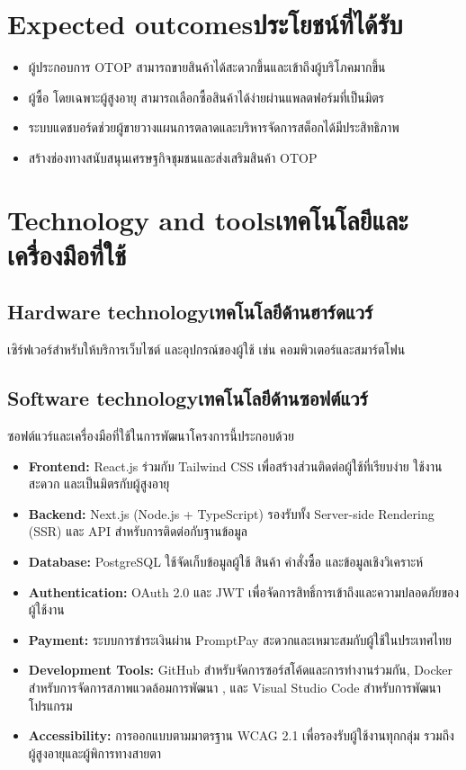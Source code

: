\section{\ifenglish Expected outcomes\else ประโยชน์ที่ได้รับ\fi}
\begin{itemize}
    \item ผู้ประกอบการ OTOP สามารถขายสินค้าได้สะดวกขึ้นและเข้าถึงผู้บริโภคมากขึ้น
    \item ผู้ซื้อ โดยเฉพาะผู้สูงอายุ สามารถเลือกซื้อสินค้าได้ง่ายผ่านแพลตฟอร์มที่เป็นมิตร
    \item ระบบแดชบอร์ดช่วยผู้ขายวางแผนการตลาดและบริหารจัดการสต็อกได้มีประสิทธิภาพ
    \item สร้างช่องทางสนับสนุนเศรษฐกิจชุมชนและส่งเสริมสินค้า OTOP
\end{itemize}

\section{\ifenglish Technology and tools\else เทคโนโลยีและเครื่องมือที่ใช้\fi}

\subsection{\ifenglish Hardware technology\else เทคโนโลยีด้านฮาร์ดแวร์\fi}
เซิร์ฟเวอร์สำหรับให้บริการเว็บไซต์ และอุปกรณ์ของผู้ใช้ เช่น คอมพิวเตอร์และสมาร์ตโฟน \cite{latexcompanion}

\subsection{\ifenglish Software technology\else เทคโนโลยีด้านซอฟต์แวร์\fi}
ซอฟต์แวร์และเครื่องมือที่ใช้ในการพัฒนาโครงการนี้ประกอบด้วย \cite{responsiveweb}

\begin{itemize}
    \item \textbf{Frontend:} React.js ร่วมกับ Tailwind CSS 
    เพื่อสร้างส่วนติดต่อผู้ใช้ที่เรียบง่าย ใช้งานสะดวก และเป็นมิตรกับผู้สูงอายุ \cite{responsiveweb}
    \item \textbf{Backend:} Next.js (Node.js + TypeScript) 
    รองรับทั้ง Server-side Rendering (SSR) และ API สำหรับการติดต่อกับฐานข้อมูล
    \item \textbf{Database:} PostgreSQL 
    ใช้จัดเก็บข้อมูลผู้ใช้ สินค้า คำสั่งซื้อ และข้อมูลเชิงวิเคราะห์
    \item \textbf{Authentication:} OAuth 2.0 และ JWT 
    เพื่อจัดการสิทธิ์การเข้าถึงและความปลอดภัยของผู้ใช้งาน
    \item \textbf{Payment:} ระบบการชำระเงินผ่าน PromptPay 
    สะดวกและเหมาะสมกับผู้ใช้ในประเทศไทย
    \item \textbf{Development Tools:} 
    GitHub สำหรับจัดการซอร์สโค้ดและการทำงานร่วมกัน, 
    Docker สำหรับการจัดการสภาพแวดล้อมการพัฒนา \cite{docker2023}, 
    และ Visual Studio Code สำหรับการพัฒนาโปรแกรม
    \item \textbf{Accessibility:} การออกแบบตามมาตรฐาน WCAG 2.1 
    เพื่อรองรับผู้ใช้งานทุกกลุ่ม รวมถึงผู้สูงอายุและผู้พิการทางสายตา
\end{itemize}


